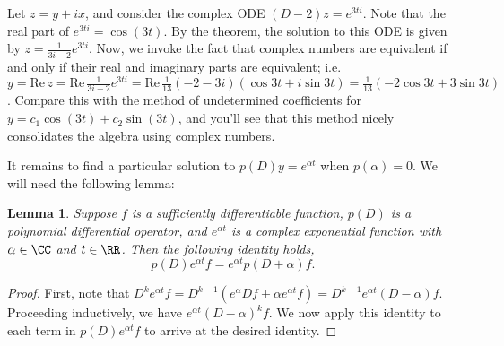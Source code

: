 \documentclass{homework} %
\newtheorem{lemma}{Lemma}
\begin{document}
Let $z = y+ix$, and consider the complex ODE $(D - 2)z = e^{3ti}$. Note that
the real part of $e^{3ti} = \cos(3t)$.  By the theorem, the solution to this
ODE is given by $z = \frac 1{3i - 2} e^{3ti}$.  Now, we invoke the fact that
complex numbers are equivalent if and only if their real and imaginary parts
are equivalent; i.e. $y = \mathrm{Re}\, z = \mathrm{Re}\, \frac 1{3i - 2}
e^{3ti} = \mathrm{Re}\, \frac 1{13} (-2 - 3i) (\cos 3t + i\sin 3t) = \frac
1{13}(-2\cos 3t + 3\sin 3t)$.  Compare this with the method of undetermined
coefficients for $y = c_1 \cos(3t) + c_2 \sin(3t)$, and you'll see that this method
nicely consolidates the algebra using complex numbers.

It remains to find a particular solution to $p(D)y = e^{\alpha t}$ when $p(\alpha) = 0$.  We will need the following lemma:
\begin{lemma}
  Suppose $f$ is a sufficiently differentiable function, $p(D)$ is a polynomial
  differential operator, and $e^{\alpha t}$ is a complex exponential function
  with $\alpha \in \CC$ and $t \in \RR$.  Then the following identity holds,
  $$
    p(D) e^{\alpha t} f = e^{\alpha t} p(D + \alpha) f.
  $$
\end{lemma}
\begin{proof}
First, note that $D^k e^{\alpha t} f = D^{k-1} (e^{\alpha} D f + \alpha e^{\alpha t}f) = D^{k-1}e^{\alpha t} (D - \alpha) f$.  Proceeding inductively, we have $e^{\alpha t} (D-\alpha)^k f$.  We now apply this identity to each term in $p(D)e^{\alpha t} f$ to arrive at the desired identity.
\end{proof}
\end{document}
